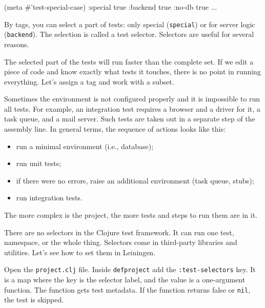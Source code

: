 \begin{english}
  \begin{clojure}
(meta #'test-special-case)
{:special true :backend true :no-db true ...}
  \end{clojure}
\end{english}

\fi

By tags, you can select a part of tests: only special (\verb|special|) or for server logic (\verb|backend|). The selection is called a test selector. Selectors are useful for several reasons.

The selected part of the tests will run faster than the complete set. If we edit a piece of code and know exactly what tests it touches, there is no point in running everything. Let's assign a tag and work with a subset.

Sometimes the environment is not configured properly and it is impossible to run all tests. For example, an integration test requires a browser and a driver for it, a task queue, and a mail server. Such tests are taken out in a separate
step of the assembly line. In general terms, the sequence of actions looks like this:

\begin{itemize}

\item
  run a minimal environment (i.e., database);

\item
  run unit tests;

\item
  if there were no errors, raise an additional environment (task queue, stubs);

\item
  run integration tests.

\end{itemize}

\noindent
The more complex is the project, the more tests and steps to run them are in it.

There are no selectors in the Clojure test framework. It can run one test, namespace, or the whole thing. Selectors come in third-party libraries and utilities. Let's see how to set them in Leiningen.

Open the \verb|project.clj| file. Inside \texttt{def\-pro\-ject} add the \verb|:test-selectors| key. It is a map where the key is the selector label, and the value is a one-argument function. The function gets test metadata. If the function returns false or \verb|nil|, the test is skipped.

